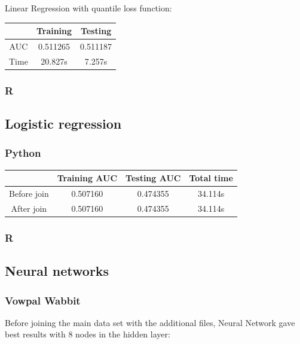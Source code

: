 \documentclass[10pt]{article}
\begin{document}
Linear Regression with quantile loss function:\\

\begin{center}
 \begin{tabular}{|c | c | c||} 
 \hline
 & Training & Testing\\ [0.5ex] 
 \hline\hline
AUC & 0.511265 & 0.511187\\ 
 \hline
Time & 20.827s & 7.257s\\ 
 \hline
\end{tabular}
\end{center}

\subsubsection{R}

\subsection{Logistic regression}
\subsubsection{Python}

\begin{center}
 \begin{tabular}{|c | c | c | c||} 
 \hline
 & Training AUC & Testing AUC & Total time\\ [0.5ex]
 \hline\hline
Before join & 0.507160 & 0.474355 & 34.114s\\
 \hline
After join & 0.507160 & 0.474355 & 34.114s\\ 
 \hline
\end{tabular}
\end{center}

\subsubsection{R}

\subsection{Neural networks}
\subsubsection{Vowpal Wabbit}
Before joining the main data set with the additional files, Neural Network gave best results with 8 nodes in the hidden layer:\\
\end{document}
